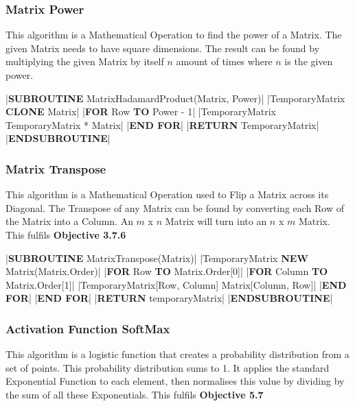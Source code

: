 \begin{flushleft}
                \vspace{0.5cm}
            \subsubsection{Matrix Power}
                This algorithm is a Mathematical Operation to find the power of a Matrix. The given Matrix needs to have square dimensions.
                The result can be found by multiplying the given Matrix by itself $n$ amount of times where $n$ is the given power.
                
                \vspace{0.2cm}
                \begin{pseudocode}
|\textbf{SUBROUTINE} MatrixHadamardProduct(Matrix, Power)|
    |TemporaryMatrix \leftarrow \textbf{CLONE} Matrix|
    |\textbf{FOR} Row  \textbf{TO} Power - 1|
        |TemporaryMatrix \leftarrow TemporaryMatrix * Matrix|
    |\textbf{END FOR}|
    |\textbf{RETURN} TemporaryMatrix|
|\textbf{ENDSUBROUTINE}|
                \end{pseudocode}  

                \vspace{0.5cm}
            \subsubsection{Matrix Transpose}
                This algorithm is a Mathematical Operation used to Flip a Matrix across its Diagonal. The Transpose of any Matrix
                can be found by converting each Row of the Matrix into a Column. An $m$ x $n$ Matrix will turn into an $n$ x $m$ Matrix.
                This fulfils \textbf{Objective 3.7.6}

                \vspace{0.2cm}
                \begin{pseudocode}
|\textbf{SUBROUTINE} MatrixTranspose(Matrix)|
    |TemporaryMatrix \leftarrow \textbf{NEW} Matrix(Matrix.Order)|
    |\textbf{FOR} Row  \textbf{TO} Matrix.Order[0]|
        |\textbf{FOR} Column  \textbf{TO} Matrix.Order[1]|
            |TemporaryMatrix[Row, Column] \leftarrow Matrix[Column, Row]|
        |\textbf{END FOR}|
    |\textbf{END FOR}|
    |\textbf{RETURN} temporaryMatrix|
|\textbf{ENDSUBROUTINE}|
                \end{pseudocode}

                \vspace{0.5cm}
            \subsubsection{Activation Function SoftMax}
                This algorithm is a logistic function that creates a probability distribution from a set of points. This probability 
                distribution sums to 1. It applies the standard Exponential Function to each element, then normalises this value by dividing
                by the sum of all these Exponentials. This fulfils \textbf{Objective 5.7}


\end{flushleft}
